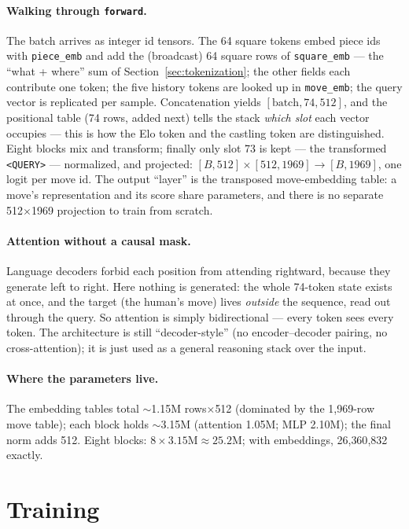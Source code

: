 \documentclass[10pt,a4paper]{article}
\newcommand{\code}[1]{\texttt{#1}}
\begin{document}
\paragraph{Walking through \texttt{forward}.} The batch arrives as
integer id tensors. The 64 square tokens embed piece ids with
\code{piece\_emb} and add the (broadcast) 64 square rows of
\code{square\_emb} --- the ``what + where'' sum of
Section~\ref{sec:tokenization}; the other fields each contribute one
token; the five history tokens are looked up in \code{move\_emb}; the
query vector is replicated per sample. Concatenation yields
$[\text{batch}, 74, 512]$, and the positional table (74 rows, added
next) tells the stack \emph{which slot} each vector occupies --- this
is how the Elo token and the castling token are distinguished. Eight
blocks mix and transform; finally only slot 73 is kept --- the
transformed \code{<QUERY>} --- normalized, and projected:
$[B,512] \times [512,1969] \rightarrow [B,1969]$, one logit per move
id. The output ``layer'' is the transposed move-embedding table: a
move's representation and its score share parameters, and there is no
separate 512$\times$1969 projection to train from scratch.

\paragraph{Attention without a causal mask.} Language decoders forbid each
position from attending rightward, because they generate left to right.
Here nothing is generated: the whole 74-token state exists at once, and
the target (the human's move) lives \emph{outside} the sequence, read out
through the query. So attention is simply bidirectional --- every token
sees every token. The architecture is still ``decoder-style'' (no
encoder--decoder pairing, no cross-attention); it is just used as a
general reasoning stack over the input.

\paragraph{Where the parameters live.} The embedding tables total
$\sim$1.15M rows$\times$512 (dominated by the 1{,}969-row move table);
each block holds $\sim$3.15M (attention 1.05M; MLP 2.10M); the final norm
adds 512. Eight blocks: $8 \times 3.15\text{M} \approx 25.2$M; with
embeddings, 26{,}360{,}832 exactly.

\section{Training}\label{sec:train}
\end{document}

